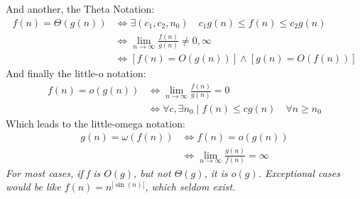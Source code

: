 \documentclass[nobib]{tufte-handout}
\begin{document}
And another, the Theta Notation:
\begin{align*}
    f(n)=\Theta(g(n)) & \iff \exists(c_1,c_2,n_0)\quad c_1g(n)\leq f(n)\leq c_2g(n)  \\
                      & \iff \lim_{n\rightarrow\infty}\frac{f(n)}{g(n)}\neq 0,\infty \\
                      & \iff [f(n) = O(g(n))] \land [g(n) = O(f(n))]
\end{align*}
And finally the little-o notation:
\begin{align*}
    f(n) = o(g(n)) & \iff \lim_{n\rightarrow\infty}\frac{f(n)}{g(n)} = 0                    \\
                   & \iff \forall c,\exists n_0 \mid f(n)\leq cg(n) \quad \forall n\geq n_0
\end{align*}
Which leads to the little-omega notation:
\begin{align*}
    g(n) = \omega(f(n)) & \iff f(n) = o(g(n))                                      \\
                        & \iff \lim_{n\rightarrow\infty}\frac{g(n)}{f(n)} = \infty
\end{align*}
\textit{For most cases, if f is $O(g)$, but not $\Theta(g)$, it is $o(g)$. Exceptional cases would be like $f(n) = n^{|\sin(n)|}$, which seldom exist.}
\end{document}

